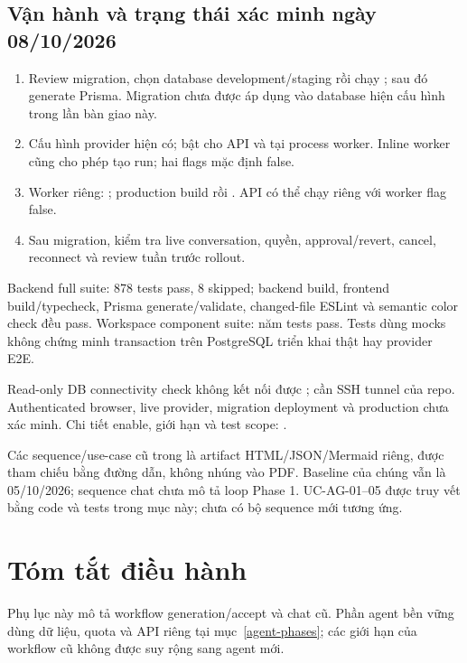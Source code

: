 \documentclass[12pt,a4paper]{article}
\begin{document}
\subsection{Vận hành và trạng thái xác minh ngày 08/10/2026}
\begin{enumerate}
  \item Review migration, chọn database development/staging rồi chạy ; sau đó generate Prisma. Migration chưa được áp dụng vào database hiện cấu hình trong lần bàn giao này.
  \item Cấu hình provider hiện có; bật  cho API và  tại process worker. Inline worker cũng cho phép tạo run; hai flags mặc định false.
  \item Worker riêng: ; production build rồi . API có thể chạy riêng với worker flag false.
  \item Sau migration, kiểm tra live conversation, quyền, approval/revert, cancel, reconnect và review tuần trước rollout.
\end{enumerate}
Backend full suite: 878 tests pass, 8 skipped; backend build, frontend build/typecheck, Prisma generate/validate, changed-file ESLint và semantic color check đều pass. Workspace component suite: năm tests pass. Tests dùng mocks không chứng minh transaction trên PostgreSQL triển khai thật hay provider E2E.

Read-only DB connectivity check không kết nối được ; cần SSH tunnel của repo. Authenticated browser, live provider, migration deployment và production chưa xác minh. Chi tiết enable, giới hạn và test scope: .

Các sequence/use-case cũ trong  là artifact HTML/JSON/Mermaid riêng, được tham chiếu bằng đường dẫn, không nhúng vào PDF. Baseline của chúng vẫn là 05/10/2026; sequence chat chưa mô tả loop Phase 1. UC-AG-01--05 được truy vết bằng code và tests trong mục này; chưa có bộ sequence mới tương ứng.

\appendix



\section{Tóm tắt điều hành}

Phụ lục này mô tả workflow generation/accept và chat cũ. Phần agent bền vững dùng dữ liệu, quota và API riêng tại mục~\ref{agent-phases}; các giới hạn của workflow cũ không được suy rộng sang agent mới.
\end{document}
